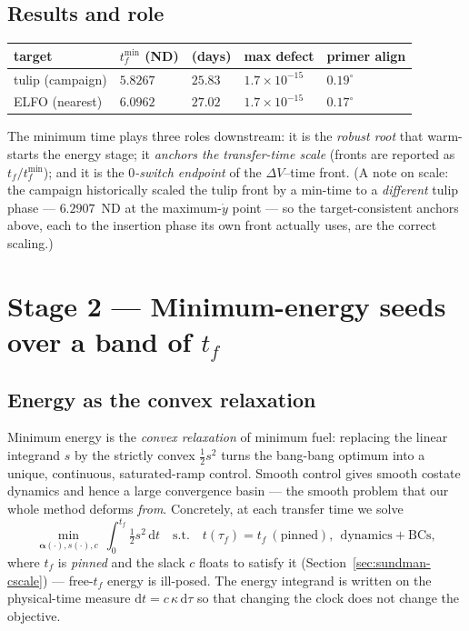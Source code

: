 \documentclass[11pt]{article}
\newcommand{\uv}{\boldsymbol{\alpha}}
\begin{document}
\subsection{Results and role}
\begin{center}
\begin{tabular}{lllll}
\toprule
target & $t_f^{\min}$ (ND) & (days) & max defect & primer align \\
\midrule
tulip (campaign) & $5.8267$ & $25.83$ & $1.7\times10^{-15}$ & $0.19^\circ$ \\
ELFO (nearest)   & $6.0962$ & $27.02$ & $1.7\times10^{-15}$ & $0.17^\circ$ \\
\bottomrule
\end{tabular}
\end{center}
The minimum time plays three roles downstream: it is the \emph{robust root} that
warm-starts the energy stage; it \emph{anchors the transfer-time scale} (fronts
are reported as $t_f/t_f^{\min}$); and it is the \emph{$0$-switch endpoint} of
the $\Delta V$--time front. (A note on scale: the campaign historically scaled
the tulip front by a min-time to a \emph{different} tulip phase --- $6.2907$~ND
at the maximum-$\dot y$ point --- so the target-consistent anchors above, each to
the insertion phase its own front actually uses, are the correct scaling.)

\section{Stage 2 --- Minimum-energy seeds over a band of $t_f$}\label{sec:energy}

\subsection{Energy as the convex relaxation}
Minimum energy is the \emph{convex relaxation} of minimum fuel: replacing the
linear integrand $s$ by the strictly convex $\tfrac12 s^2$ turns the bang-bang
optimum into a unique, continuous, saturated-ramp control. Smooth control gives
smooth costate dynamics and hence a large convergence basin --- the smooth
problem that our whole method deforms \emph{from}. Concretely, at each transfer
time we solve
\begin{equation}
  \min_{\uv(\cdot),s(\cdot),c}\ \int_0^{t_f}\! \tfrac12 s^2\,\mathrm{d}t
  \quad\text{s.t.}\quad t(\tau_f)=t_f\ (\text{pinned}),\ \ \text{dynamics}+\text{BCs},
  \label{eq:energy}
\end{equation}
where $t_f$ is \emph{pinned} and the slack $c$ floats to satisfy it
(Section~\ref{sec:sundman-cscale}) --- free-$t_f$ energy is ill-posed. The energy
integrand is written on the physical-time measure $\mathrm{d}t=c\,\kappa\,
\mathrm{d}\tau$ so that changing the clock does not change the objective.
\end{document}
